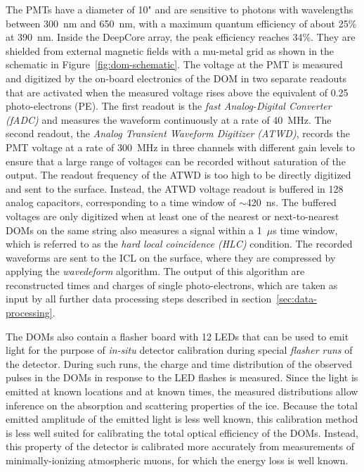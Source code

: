 The PMTs have a diameter of 10" and are sensitive to photons with wavelengths between 300~nm and 650~nm, with a maximum quantum efficiency of about 25\% at 390~nm. Inside the DeepCore array, the peak efficiency reaches 34\%. They are shielded from external magnetic fields with a mu-metal grid as shown in the schematic in Figure~\ref{fig:dom-schematic}. The voltage at the PMT is measured and digitized by the on-board electronics of the DOM in two separate readouts that are activated when the measured voltage rises above the equivalent of 0.25 photo-electrons (PE). The first readout is the \emph{fast Analog-Digital Converter (fADC)} and measures the waveform continuously at a rate of 40~MHz. The second readout, the \emph{Analog Transient Waveform Digitizer (ATWD)}, records the PMT voltage at a rate of 300~MHz in three channels with different gain levels to ensure that a large range of voltages can be recorded without saturation of the output. The readout frequency of the ATWD is too high to be directly digitized and sent to the surface. Instead, the ATWD voltage readout is buffered in 128 analog capacitors, corresponding to a time window of $\sim$420~ns. The buffered voltages are only digitized when at least one of the nearest or next-to-nearest DOMs on the same string also measures a signal within a 1~$\mu$s time window, which is referred to as the \emph{hard local coincidence (HLC)} condition. The recorded waveforms are sent to the ICL on the surface, where they are compressed by applying the \emph{wavedeform} algorithm. The output of this algorithm are reconstructed times and charges of single photo-electrons, which are taken as input by all further data processing steps described in section~\ref{sec:data-processing}.

The DOMs also contain a flasher board with 12 LEDs that can be used to emit light for the purpose of \emph{in-situ} detector calibration during special \emph{flasher runs} of the detector. During such runs, the charge and time distribution of the observed pulses in the DOMs in response to the LED flashes is measured. Since the light is emitted at known locations and at known times, the measured distributions allow inference on the absorption and scattering properties of the ice. Because the total emitted amplitude of the emitted light is less well known, this calibration method is less well suited for calibrating the total optical efficiency of the DOMs. Instead, this property of the detector is calibrated more accurately from measurements of minimally-ionizing atmospheric muons, for which the energy loss is well known.
